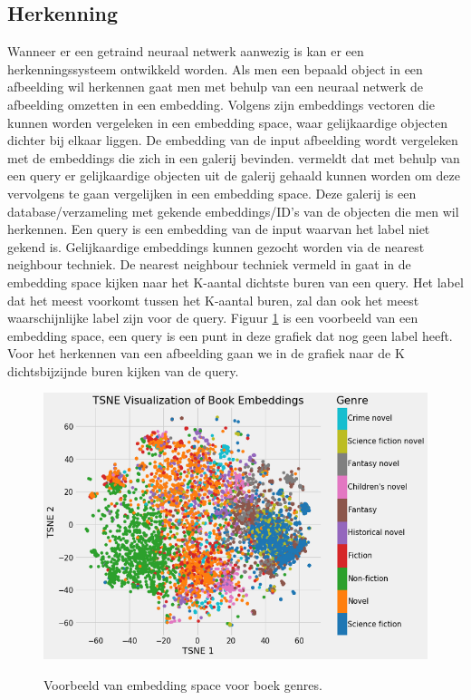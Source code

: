 \subsection{Herkenning}
Wanneer er een getraind neuraal netwerk aanwezig is kan er een herkenningssysteem ontwikkeld worden. 
Als men een bepaald object in een afbeelding wil herkennen gaat men met behulp van een neuraal netwerk de afbeelding omzetten in een embedding. 
Volgens \cite{koehrsen_neural_2018} zijn embeddings vectoren die kunnen worden vergeleken in een embedding space, waar gelijkaardige objecten dichter bij elkaar liggen. 
De embedding van de input afbeelding wordt vergeleken met de embeddings die zich in een galerij bevinden. 
\cite{jiang_deep_2019} vermeldt dat met behulp van een query er gelijkaardige objecten uit de galerij gehaald kunnen worden om deze vervolgens te gaan vergelijken in een embedding space. 
Deze galerij is een database/verzameling met gekende embeddings/ID's van de objecten die men wil herkennen.
Een query is een embedding van de input waarvan het label niet gekend is.
Gelijkaardige embeddings kunnen gezocht worden via de nearest neighbour techniek.
De nearest neighbour techniek vermeld in \cite{8010421} gaat in de embedding space kijken naar het K-aantal dichtste buren van een query.
Het label dat het meest voorkomt tussen het K-aantal buren, zal dan ook het meest waarschijnlijke label zijn voor de query.
Figuur \ref{fig:embedding} is een voorbeeld van een embedding space, een query is een punt in deze grafiek dat nog geen label heeft.
Voor het herkennen van een afbeelding gaan we in de grafiek naar de K dichtsbijzijnde buren kijken van de query.

\begin{figure}[!ht]
    \centering
 	\includegraphics[width=0.7\linewidth]{fig/embedding.png}
 	\caption{Voorbeeld van embedding space voor boek genres.}
	\cite{koehrsen_neural_2018}
 	\label{fig:embedding}
\end{figure}

